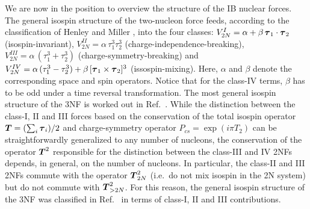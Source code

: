 \documentclass[aps,rmp,nofootinbib,twocolumn,floatfix]{revtex4}
\newcommand{\fet}[1]{\mbox{\boldmath $#1$}}
\begin{document}
We are now in the position to overview the structure of the IB nuclear
forces. The general isospin structure of the two-nucleon force feeds,
according to the classification of Henley and Miller \cite{Henley:1979ig}, into the
four classes:  $V_{2N}^I = \alpha + \beta \, \fet \tau_1 \cdot \fet \tau_2$
(isospin-invariant), $V_{2N}^{II} = \alpha \, \tau_1^3 \tau_2^3$
(charge-independence-breaking), 
 $V_{2N}^{III} = \alpha \, (\tau_1^3  + \tau_2^3 )$
(charge-symmetry-breaking) and 
$V_{2N}^{IV} = \alpha \, (\tau_1^3  - \tau_2^3 ) + \beta \, [ \fet \tau_1 \times
\fet \tau_2 ]^3$ (issospin-mixing). Here, $\alpha$ and $\beta$ denote
the corresponding space and spin operators. Notice that for the class-IV
terms, $\beta$ has to be odd under a time reversal transformation. The
most general isospin structure of the 3NF is worked out in
Ref.~\cite{Epelbaum:2004xf}. While the distinction between the class-I, II and
III forces based on the conservation of the total isospin operator $\fet T =
(\sum_i \fet \tau_i )/2$ and charge-symmetry operator $P_{cs} = \exp(i \pi
T_2)$ can be straightforwardly generalized to any number of nucleons, the
conservation of the operator $\fet T^2$ responsible for the
distinction between the class-III and IV 2NFs depends, in general, on the
number of nucleons. In particular, the class-II and III 2NFs commute with the
operator $\fet T_{2N}^2$ (i.e.~do not mix isospin in the 2N system) but do not
commute with $\fet T_{>2N}^2$. For this reason, the general isospin structure
of the 3NF was classified in Ref.~\cite{Epelbaum:2004xf} in terms of class-I,
II and III contributions. 
\end{document}
